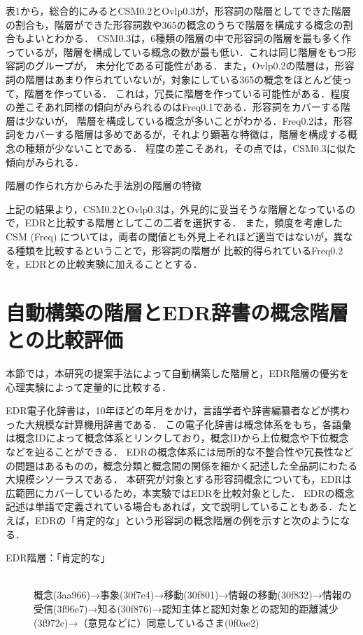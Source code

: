 \documentclass[japanese]{jnlp_1.4}
\begin{document}
表1から，総合的にみるとCSM0.2とOvlp0.3が，形容詞の階層としてできた階層の割合も，階層ができた形容詞数や365の概念のうちで階層を構成する概念の割合もよいとわかる．
CSM0.3は，6種類の階層の中で形容詞の階層を最も多く作っているが，階層を構成している概念の数が最も低い．これは同じ階層をもつ形容詞のグループが，
未分化である可能性がある．また，Ovlp0.2の階層は，形容詞の階層はあまり作られていないが，対象にしている365の概念をほとんど使って，階層を作っている．
これは，冗長に階層を作っている可能性がある．程度の差こそあれ同様の傾向がみられるのはFreq0.1である．形容詞をカバーする階層は少ないが，
階層を構成している概念が多いことがわかる．Freq0.2は，形容詞をカバーする階層は多めであるが，それより顕著な特徴は，階層を構成する概念の種類が少ないことである．
程度の差こそあれ，その点では，CSM0.3に似た傾向がみられる．

\begin{table}[t]
\caption{階層の作られ方からみた手法別の階層の特徴}

\end{table}

上記の結果より，CSM0.2とOvlp0.3は，外見的に妥当そうな階層となっているので，EDRと比較する階層としてこの二者を選択する．
また，頻度を考慮したCSM (Freq) については，両者の閾値とも外見上それほど適当ではないが，異なる種類を比較するということで，形容詞の階層が
比較的得られているFreq0.2を，EDRとの比較実験に加えることとする．


\section{自動構築の階層とEDR辞書の概念階層との比較評価}

本節では，本研究の提案手法によって自動構築した階層と，EDR階層の優劣を心理実験によって定量的に比較する．

EDR電子化辞書は，10年ほどの年月をかけ，言語学者や辞書編纂者などが携わった大規模な計算機用辞書である．
この電子化辞書は概念体系をもち，各語彙は概念IDによって概念体系とリンクしており，概念IDから上位概念や下位概念などを辿ることができる．
EDRの概念体系には局所的な不整合性や冗長性などの問題はあるものの，概念分類と概念間の関係を細かく記述した全品詞にわたる大規模シソーラスである．
本研究が対象とする形容詞概念についても，EDRは広範囲にカバーしているため，本実験ではEDRを比較対象とした．
EDRの概念記述は単語で定義されている場合もあれば，文で説明していることもある．たとえば，EDRの「肯定的な」という形容詞の概念階層の例を示すと次のようになる．


\begin{description}
\item[EDR階層：「肯定的な」] \mbox{} \\
概念(3aa966)→事象(30f7e4)→移動(30f801)→情報の移動(30f832)→情報の受信(3f96e7)→知る(30f876)→認知主体と認知対象との認知的距離減少(3f972c)→（意見などに）同意しているさま(0f0ae2)
\end{description}
\end{document}
